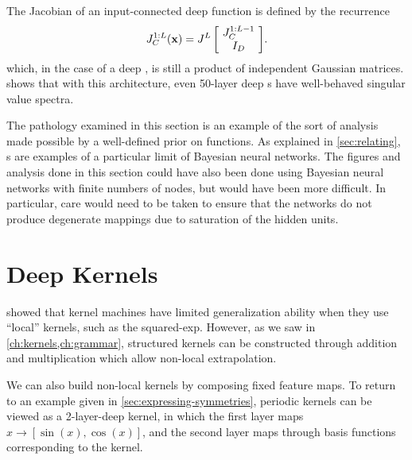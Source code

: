 The Jacobian of an input-connected deep function is defined by the recurrence
%
\newcommand{\sbi}[2]{\left[ \! \begin{array}{c} #1 \\ #2 \end{array} \! \right]} 
\begin{align}
{J_C^{1:L}(\vx) = J^L \sbi{ J_C^{1:L-1}}{I_D}}.
\end{align}
%
%
%
which, in the case of a deep \gp{}, is still a product of independent Gaussian matrices.
 shows that with this architecture, even 50-layer deep \gp{}s have well-behaved singular value spectra.

The pathology examined in this section is an example of the sort of analysis made possible by a well-defined prior on functions.
As explained in \cref{sec:relating}, \gp{}s are examples of a particular limit of Bayesian neural networks.
The figures and analysis done in this section could have also been done using Bayesian neural networks with finite numbers of nodes, but would have been more difficult.
In particular, care would need to be taken to ensure that the networks do not produce degenerate mappings due to saturation of the hidden units.





\section{Deep Kernels}
\label{sec:deep_kernels}


\cite{ bengio2006curse} showed that kernel machines have limited generalization ability when they use ``local'' kernels, such as the squared-exp.
However, as we saw in \cref{ch:kernels,ch:grammar}, structured kernels can be constructed through addition and multiplication which allow non-local extrapolation.

We can also build non-local kernels by composing fixed feature maps.
To return to an example given in \cref{sec:expressing-symmetries}, periodic kernels can be viewed as a 2-layer-deep kernel, in which the first layer maps $x \rightarrow [\sin(x), \cos(x)]$, and the second layer maps through basis functions corresponding to the  kernel.


